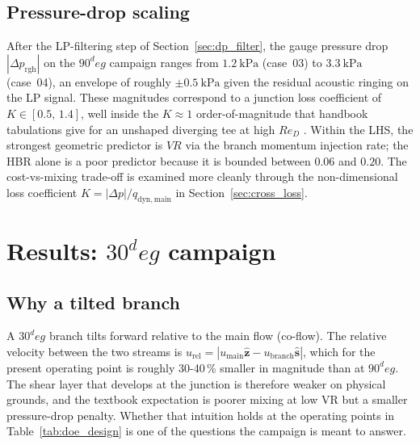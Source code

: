 \documentclass[11pt,a4paper]{article}
\def\VR{VR}%
\def\HBR{HBR}%
\def\circ{ deg}%
\newcommand{\VR}{\ensuremath{\mathrm{VR}}}
\newcommand{\HBR}{\ensuremath{\mathrm{HBR}}}
\begin{document}
\subsection{Pressure-drop scaling}
\label{sec:results_90_dp}
After the LP-filtering step of Section~\ref{sec:dp_filter}, the
gauge pressure drop \(|\Delta p_{\mathrm{rgh}}|\) on the
\(90^\circ\) campaign ranges from \(\SI{1.2}{\kilo\pascal}\)
(case~03) to \(\SI{3.3}{\kilo\pascal}\) (case~04), an envelope of
roughly \(\pm\SI{0.5}{\kilo\pascal}\) given the residual acoustic
ringing on the LP signal. These magnitudes correspond to a
junction loss coefficient of \(K \in [0.5,\,1.4]\), well inside the
\(K \approx 1\) order-of-magnitude that handbook tabulations give
for an unshaped diverging tee at high \(Re_D\)
\citep{idelchik1986handbook}. Within the LHS, the strongest
geometric predictor is \(\VR\) via the branch momentum injection
rate; the \HBR{} alone is a poor predictor because it is bounded
between \(0.06\) and \(0.20\). The cost-vs-mixing trade-off is
examined more cleanly through the non-dimensional loss coefficient
\(K = |\Delta p|/q_{\mathrm{dyn,main}}\) in
Section~\ref{sec:cross_loss}.

\section{\texorpdfstring{Results: $30^\circ$ campaign}{Results: 30 deg campaign}}
\label{sec:results_30}

\subsection{Why a tilted branch}
\label{sec:30_why}
A \(30^\circ\) branch tilts forward relative to the main flow
(co-flow). The relative velocity between the two streams is
\(u_{\mathrm{rel}} = |u_{\mathrm{main}}\hat{\mathbf{z}} -
u_{\mathrm{branch}}\hat{\mathbf{s}}|\), which for the present
operating point is roughly 30-40\,\% smaller in magnitude than at
\(90^\circ\). The shear layer that develops at the junction is
therefore weaker on physical grounds, and the textbook expectation
is poorer mixing at low \VR{} but a smaller pressure-drop penalty.
Whether that intuition holds at the operating points in
Table~\ref{tab:doe_design} is one of the questions the campaign is
meant to answer.
\end{document}
